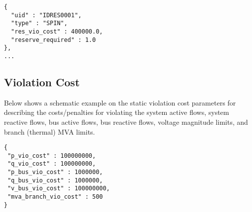 \begin{verbatim}
{
  "uid" : "IDRES0001",
  "type" : "SPIN",
  "res_vio_cost" : 400000.0,
  "reserve_required" : 1.0
},
...
\end{verbatim}


\subsection{Violation Cost}
\label{sec:violation}

Below shows a schematic example on the static violation cost parameters for 
describing the costs/penalties for violating the system active flows, system reactive flows,
bus active flows, bus reactive flows, 
voltage magnitude limits, 
and branch (thermal) MVA limits. 

\begin{verbatim}
{
 "p_vio_cost" : 100000000,
 "q_vio_cost" : 100000000,
 "p_bus_vio_cost" : 1000000,
 "q_bus_vio_cost" : 1000000,
 "v_bus_vio_cost" : 100000000,
 "mva_branch_vio_cost" : 500
}
\end{verbatim}



\endinput 









\subsection{Substation}
\label{sec:substation}
A \emph{substation} is a collection of equipment located at a the same physical site and belonging to one Transmission System Operator (TSO). 
It is usually composed of different voltage levels with transformers.
Substation objects are required to have: 
\begin{itemize}
    \item A \texttt{"uid"} object\\
    The value of the object must be a unique ID (string) identifying the component.    
    \item A \texttt{"buses"} object\\
    The value of the object is an array identifying the unique IDs of the buses located within the substation.    
\end{itemize}
Network example:
\begin{verbatim}
{
  "uid" : "IDSUB0001",
  "buses" : ["IDB0001", "IDB0002", "IDB0010"],
},
…    
\end{verbatim}



